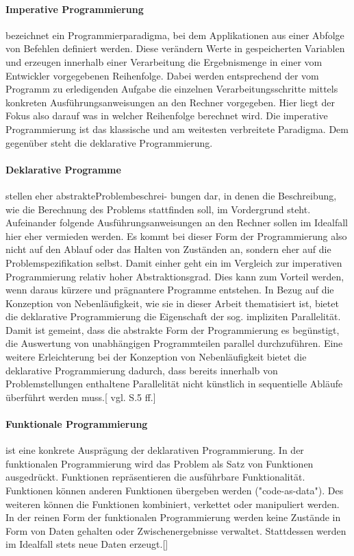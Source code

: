 \documentclass[12pt,oneside,a4paper,bibtotoc,liststotoc]{scrreprt}
\begin{document}
\paragraph{Imperative Programmierung} bezeichnet ein Programmierparadigma, bei dem Applikationen aus einer Abfolge von Befehlen definiert werden. Diese verändern Werte in gespeicherten Variablen und erzeugen innerhalb einer Verarbeitung die Ergebnismenge in einer vom Entwickler vorgegebenen Reihenfolge. Dabei werden entsprechend der vom Programm zu erledigenden Aufgabe die einzelnen Verarbeitungsschritte mittels konkreten Ausführungsanweisungen an den Rechner vorgegeben. Hier liegt der Fokus also darauf was in welcher Reihenfolge berechnet wird. Die imperative Programmierung ist das klassische und am weitesten verbreitete Paradigma. Dem gegenüber steht die deklarative Programmierung.

\paragraph{Deklarative Programme} stellen eher \glqq abstrakte\grqq Problembeschrei- bungen dar, in denen die Beschreibung, wie die Berechnung des Problems stattfinden soll, im Vordergrund steht. Aufeinander folgende Ausführungsanweisungen an den Rechner sollen im Idealfall hier eher vermieden werden. Es kommt bei dieser Form der Programmierung also nicht auf den Ablauf oder das Halten von Zuständen an, sondern eher auf die Problemspezifikation selbst. Damit einher geht ein im Vergleich zur imperativen Programmierung relativ hoher Abstraktionsgrad. Dies kann zum Vorteil werden, wenn daraus kürzere und prägnantere Programme entstehen. In Bezug auf die Konzeption von Nebenläufigkeit, wie sie in dieser Arbeit thematisiert ist, bietet die deklarative Programmierung die Eigenschaft der sog. impliziten Parallelität. Damit ist gemeint, dass die abstrakte Form der Programmierung es begünstigt, die Auswertung von unabhängigen Programmteilen parallel durchzuführen. Eine weitere Erleichterung bei der Konzeption von Nebenläufigkeit bietet die deklarative Programmierung dadurch, dass bereits innerhalb von Problemstellungen enthaltene Parallelität nicht künstlich in sequentielle Abläufe überführt werden muss.[\citet {declarativProgrammingScript} vgl. S.5 ff.] 
\paragraph{Funktionale Programmierung} ist eine konkrete Ausprägung der deklarativen Programmierung. In der funktionalen Programmierung wird das Problem als Satz von Funktionen ausgedrückt. Funktionen repräsentieren die ausführbare Funktionalität. Funktionen können anderen Funktionen übergeben werden ("code-as-data"). Des weiteren können die Funktionen kombiniert, verkettet oder manipuliert werden. In der reinen Form der funktionalen Programmierung werden keine Zustände in Form von Daten gehalten oder Zwischenergebnisse verwaltet. Stattdessen werden im Idealfall stets neue Daten erzeugt.[\citet{funcProgrJava}]   
\end{document}

